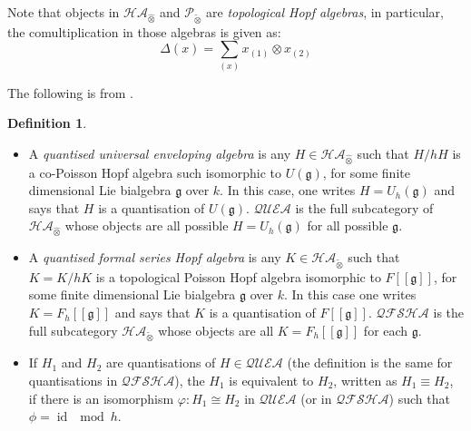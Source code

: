 \documentclass[8pt]{article}
\theoremstyle{definition}
\newtheorem{definition}{Definition}[section]
\theoremstyle{definition}
\theoremstyle{definition}
\theoremstyle{definition}
\theoremstyle{definition}
\theoremstyle{definition}
\theoremstyle{definition}
\theoremstyle{definition}
\theoremstyle{definition}
\theoremstyle{definition}
\theoremstyle{definition}
\theoremstyle{definition}
\theoremstyle{definition}
\theoremstyle{definition}
\theoremstyle{question}
\newcommand{\tildetimes}[0]{\widetilde{\otimes}}
\begin{document}
Note that objects in $\mathcal{HA}_{\widehat{\otimes}}$ and $\mathcal{P}_{\tildetimes}$ are \emph{topological Hopf algebras}, in particular,
the comultiplication in those algebras is given as:
\[
\Delta(x) = \sum \limits_{(x)} x_{(1)} \otimes x_{(2)}
\]

The following is from \cite{drinfeld1986quantum}.

\begin{definition}
  $ $

  \begin{itemize}
    \item A \emph{quantised universal enveloping algebra} is any $H \in \mathcal{HA}_{\widehat{\otimes}}$
    such that $H/hH$ is a co-Poisson Hopf algebra such isomorphic to $U(\mathfrak{g})$, for some finite dimensional
    Lie bialgebra $\mathfrak{g}$ over $k$. In this case, one writes $H = U_h(\mathfrak{g})$ and says that $H$ is a quantisation
    of $U(\mathfrak{g})$. $\mathcal{QUEA}$ is the full subcategory of $\mathcal{HA}_{\widehat{\otimes}}$
    whose objects are all possible $H = U_h(\mathfrak{g})$ for all possible $\mathfrak{g}$.
    \item A \emph{quantised formal series Hopf algebra} is any $K \in \mathcal{HA}_{\tildetimes}$
    such that $K = K/hK$ is a topological Poisson Hopf algebra isomorphic to $F[[\mathfrak{g}]]$,
    for some finite dimensional Lie bialgebra $\mathfrak{g}$ over $k$. In this case one writes $K = F_h[[\mathfrak{g}]]$
    and says that $K$ is a quantisation of $F[[\mathfrak{g}]]$. $\mathcal{QFSHA}$ is the full subcategory 
    $\mathcal{HA}_{\tildetimes}$ whose objects are all $K = F_h[[\mathfrak{g}]]$ for each $\mathfrak{g}$.
    \item If $H_1$ and $H_2$ are quantisations of $H \in \mathcal{QUEA}$ 
    (the definition is the same for quantisations in $\mathcal{QFSHA}$),
    the $H_1$ is equivalent to $H_2$, written as $H_1 \equiv H_2$, if there is 
    an isomorphism $\varphi : H_1 \cong H_2$ in $\mathcal{QUEA}$ (or in $\mathcal{QFSHA}$)
    such that $\phi = \operatorname{id} \mod h$.
  \end{itemize}
\end{definition}
\end{document}

